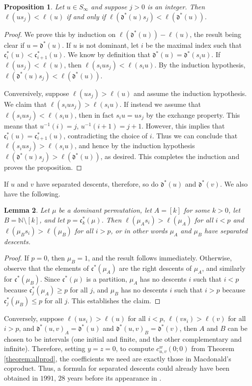 \documentclass{amsart}
\newtheorem{lemma}{Lemma}[subsection]
\newtheorem{proposition}[lemma]{Proposition}
\theoremstyle{definition}
\theoremstyle{remark}
\numberwithin{equation}{subsection}
\newcommand{\dom}{\mathfrak{d}}
\newcommand{\ldom}{\dom^*}
\newcommand{\code}{\mathfrak{c}}
\begin{document}
\begin{proposition} \label{proposition:mudescents}
Let $u\in S_\infty$ and suppose $j>0$ is an integer. Then $\ell(us_j)<\ell(u)$ if and only if $\ell(\ldom(u)s_j)<\ell(\ldom(u))$.
\end{proposition}
\begin{proof}
We prove this by induction on $\ell(\ldom(u))-\ell(u)$, the result being clear if $u=\ldom(u)$. If $u$ is not dominant, let $i$ be the maximal index such that $\code_i^*(u)<\code_{i+1}^*(u)$. We know by definition that $\ldom(u)=\ldom(s_iu)$. If $\ell(us_j)<\ell(u)$, then $\ell(s_ius_j)<\ell(s_iu)$. By the induction hypothesis, $\ell(\ldom(u)s_j)<\ell(\ldom(u))$. 

Conversively, suppose $\ell(us_j)>\ell(u)$ and assume the induction hypothesis.  We claim that $\ell(s_ius_j)>\ell(s_iu)$. If instead we assume that $\ell(s_ius_j)<\ell(s_iu)$, then in fact $s_iu=us_j$ by the exchange property. This means that $u^{-1}(i)=j$, $u^{-1}(i+1)=j+1$. However, this implies that $\code_i^*(u)=\code_{i+1}^*(u)$, contradicting the choice of $i$. Thus we can conclude that $\ell(s_ius_j)>\ell(s_iu)$, and hence by the induction hypothesis $\ell(\ldom(u)s_j)>\ell(\ldom(u))$, as desired. This completes the induction and proves the proposition.
\end{proof}

If $u$ and $v$ have separated descents, therefore, so do $\ldom(u)$ and $\ldom(v)$. We also have the following.

\begin{lemma} \label{lemma:separateddom}
Let $\mu$ be a dominant permutation, let $A=[k]$ for some $k>0$, let $B=\mathbb N\setminus [k]$, and let $p=\code^*_k(\mu)$. Then $\ell(\mu_As_i)>\ell(\mu_A)$ for all $i<p$ and $\ell(\mu_Bs_i)>\ell(\mu_B)$ for all $i>p$, or in other words $\mu_A$ and $\mu_B$ have separated descents.
\end{lemma}
\begin{proof}
If $p=0$, then $\mu_B=1$, and the result follows immediately. Otherwise, observe that the elements of $\code^*(\mu_A)$ are the right descents of $\mu_A$, and similarly for $\code^*(\mu_B)$. Since $\code^*(\mu)$ is a partition, $\mu_A$ has no descents $i$ such that $i<p$ because $\code^*_j(\mu_A)\geq p$ for all $j$, and $\mu_B$ has no descents $i$ such that $i>p$ because $\code_j^*(\mu_B)\leq p$ for all $j$. This establishes the claim.
\end{proof}

Conversely, suppose $\ell(us_i)>\ell(u)$ for all $i<p$, $\ell(vs_i)>\ell(v)$ for all $i>p$, and $\ldom(u,v)_A=\ldom(u)$ and $\ldom(u,v)_B=\ldom(v)$, then $A$ and $B$ can be chosen to be intervals (one initial and finite, and the other complementary and infinite). Therefore, setting $y=z=0$, to compute $c_{u,v}^w(0;0)$ from Theorem \ref{theorem:allprod}, the coefficients we need are exactly those in Macdonald's coproduct. Thus, a formula for separated descents could already have been obtained in $1991$, $28$ years before its appearance in \cite{kzj}.
\end{document}
